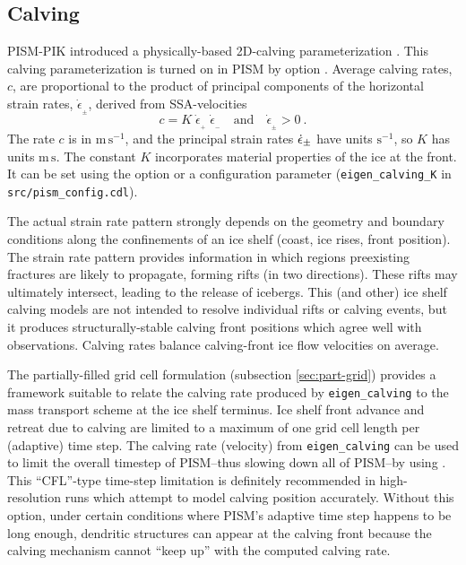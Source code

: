 \subsection{Calving}
\label{sec:calving}

PISM-PIK introduced a physically-based 2D-calving parameterization \cite{Levermannetal2012}.  This calving parameterization is turned on in PISM by option .  Average calving rates, $c$, are proportional to the product of principal components of the horizontal strain rates, $\dot{\epsilon}_{_\pm}$, derived from SSA-velocities 
\begin{equation}
\label{eq: calv2}
c = K\; \dot{\epsilon}_{_+}\; \dot{\epsilon}_{_-}\quad\text{and}\quad\dot{\epsilon}_{_\pm}>0\:.
\end{equation}
The rate $c$ is in $\text{m}\,\text{s}^{-1}$, and the principal strain rates $\dot{\epsilon}_\pm$ have units $\text{s}^{-1}$, so $K$ has units $\text{m}\,\text{s}$.  The constant $K$ incorporates material properties of the ice at the front.  It can be set using the  option or a configuration parameter (\texttt{eigen_calving_K} in \texttt{src/pism_config.cdl}).

The actual strain rate pattern strongly depends on the geometry and boundary conditions along the confinements of an ice shelf (coast, ice rises, front position).  The strain rate pattern provides information in which regions preexisting fractures are likely to propagate, forming rifts (in two directions).  These rifts may ultimately intersect, leading to the release of icebergs.  This (and other) ice shelf calving models are not intended to resolve individual rifts or calving events, but it produces structurally-stable calving front positions which agree well with observations.  Calving rates balance calving-front ice flow velocities on average.

The partially-filled grid cell formulation (subsection \ref{sec:part-grid}) provides a framework suitable to relate the calving rate produced by \texttt{eigen_calving} to the mass transport scheme at the ice shelf terminus.  Ice shelf front advance and retreat due to calving are limited to a maximum of one grid cell length per (adaptive) time step.  The calving rate (velocity) from \texttt{eigen_calving} can be used to limit the overall timestep of PISM--thus slowing down all of PISM--by using .  This ``CFL''-type time-step limitation is definitely recommended in high-resolution runs which attempt to model calving position accurately.  Without this option, under certain conditions where PISM's adaptive time step happens to be long enough, dendritic structures can appear at the calving front because the calving mechanism cannot ``keep up'' with the computed calving rate.

